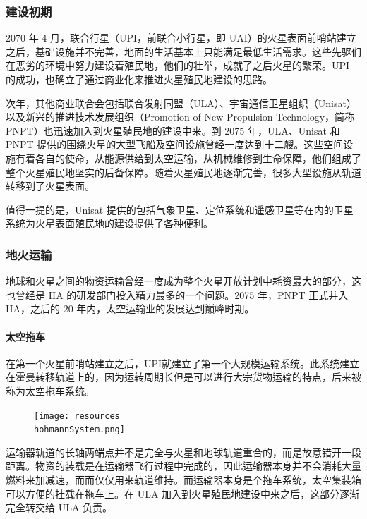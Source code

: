 \documentclass[letterpaper,10pt]{sphinxmanual}
\begin{document}
\subsubsection{建设初期}
\label{history:id20}
2070 年 4 月，联合行星（UPI，前联合小行星，即 UAI）的火星表面前哨站建立之后，基础设施并不完善，地面的生活基本上只能满足最低生活需求。这些先驱们在恶劣的环境中努力建设着殖民地，他们的壮举，成就了之后火星的繁荣。UPI 的成功，也确立了通过商业化来推进火星殖民地建设的思路。

次年，其他商业联合会包括联合发射同盟（ULA）、宇宙通信卫星组织（Unisat）以及新兴的推进技术发展组织（Promotion of New Propulsion Technology，简称PNPT）也迅速加入到火星殖民地的建设中来。到 2075 年，ULA、Unisat 和 PNPT 提供的围绕火星的大型飞船及空间设施曾经一度达到十二艘。这些空间设施有着各自的使命，从能源供给到太空运输，从机械维修到生命保障，他们组成了整个火星殖民地坚实的后备保障。随着火星殖民地逐渐完善，很多大型设施从轨道转移到了火星表面。

值得一提的是，Unisat 提供的包括气象卫星、定位系统和遥感卫星等在内的卫星系统为火星表面殖民地的建设提供了各种便利。


\subsubsection{地火运输}
\label{history:id21}
地球和火星之间的物资运输曾经一度成为整个火星开放计划中耗资最大的部分，这也曾经是 IIA 的研发部门投入精力最多的一个问题。2075 年，PNPT 正式并入 IIA，之后的 20 年内，太空运输业的发展达到巅峰时期。


\paragraph{太空拖车}
\label{history:index-38}\label{history:id22}
在第一个火星前哨站建立之后，UPI就建立了第一个大规模运输系统。此系统建立在霍曼转移轨道上的，因为运转周期长但是可以进行大宗货物运输的特点，后来被称为太空拖车系统。
\begin{figure}[htbp]
\centering

\texttt{[image: resources\\hohmannSystem.png]}
\end{figure}

运输器轨道的长轴两端点并不是完全与火星和地球轨道重合的，而是故意错开一段距离。物资的装载是在运输器飞行过程中完成的，因此运输器本身并不会消耗大量燃料来加减速，而而仅仅用来轨道维持。而运输器本身是个拖车系统，太空集装箱可以方便的挂载在拖车上。在 ULA 加入到火星殖民地建设中来之后，这部分逐渐完全转交给 ULA 负责。
\end{document}
